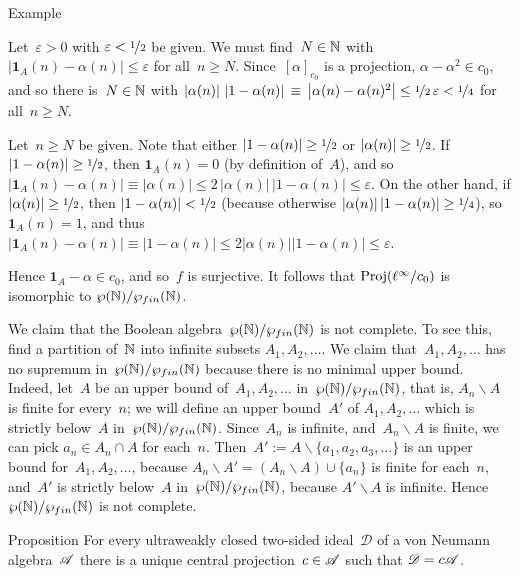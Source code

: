 \documentclass[a]{subfiles}
\begin{document}
\begin{parsec}
\begin{point}{Example}
\begin{point}
Let~$\varepsilon>0$ with $\varepsilon<\nicefrac{1}{2}$ be given.
We must find~$N\in\mathbb{N}$ with 
$\left| \mathbf{1}_A(n)-\alpha(n)\right|\leq \varepsilon$
for all~$n\geq N$.
Since~$[\alpha]_{c_0}$ is a projection,
$\alpha-\alpha^2\in c_0$,
and so
there is~$N\in \mathbb{N}$
with $\left|\alpha(n)\right| \,\left| 1-\alpha(n)\right|
\,\equiv\, \left| \alpha(n) - \alpha(n)^2 \right| \leq 
\nicefrac{1}{2}\,\varepsilon < \nicefrac{1}{4}$
for all~$n\geq N$.

Let~$n\geq N$ be given.
Note that either 
$\left|1-\alpha(n)\right|\geq \nicefrac{1}{2}$
or 
$\left|\alpha(n)\right|\geq \nicefrac{1}{2}$.
If~$\left|1-\alpha(n)\right|\geq\nicefrac{1}{2}$,
then $\mathbf{1}_A(n)=0$
(by definition of~$A$),
and so $\left|\mathbf{1}_A(n)-\alpha(n)\right|\equiv \left|\alpha(n)\right| 
\leq 2 \,\left|\alpha(n)\right|\,\left| 1-\alpha(n)\right|
\leq \varepsilon$.
On the other hand,
if  $\left|\alpha(n)\right| \geq \nicefrac{1}{2}$,
then $\left|1-\alpha(n)\right| < \nicefrac{1}{2}$
(because otherwise $\left|\alpha(n)\right|\left|1-\alpha(n)\right|
\geq \nicefrac{1}{4}$),
so $\mathbf{1}_A(n)=1$,
and thus
$\left|\mathbf{1}_A(n)-\alpha(n)\right|
\equiv \left|1-\alpha(n)\right|
\leq 2 \left|\alpha(n)\right|\left|1-\alpha(n)\right|
\leq \varepsilon$.

Hence $\mathbf{1}_A - \alpha \in c_0$,
and so~$f$ is surjective.
It follows that $\operatorname{Proj}(\ell^\infty/c_0)$
is isomorphic to $\wp(\mathbb{N})/\wp_{fin}(\mathbb{N})$.
\end{point}
\begin{point}%
We claim that the Boolean algebra~$\wp(\mathbb{N})/\wp_{fin}(\mathbb{N})$
is not complete.
To see this,
find a partition of~$\mathbb{N}$ into infinite subsets
$A_1,A_2,\dotsc$.
We claim that~$A_1,A_2,\dotsc$ has no supremum in~$\wp(\mathbb{N})/\wp_{fin}(\mathbb{N})$
because there is no minimal upper bound.
Indeed,
let~$A$ be an upper bound of~$A_1,A_2,\dotsc$ in~$\wp(\mathbb{N})/\wp_{fin}(\mathbb{N})$,
that is, $A_n\backslash A$ is finite for every~$n$;
we will define an upper bound~$A'$ of $A_1,A_2,\dotsc$
which is strictly below~$A$ in~$\wp(\mathbb{N})/\wp_{fin}(\mathbb{N})$.
Since~$A_n$ is infinite,
and~$A_n\backslash A$ is finite,
we can pick $a_n\in A_n\cap A$ for each~$n$.
Then~$A':=A \backslash \{a_1,a_2,a_3,\dotsc\}$
is an upper bound for~$A_1,A_2,\dotsc$,
because $A_n\backslash A' = (A_n\backslash A)\cup\{a_n\}$ is finite
for each~$n$,
and~$A'$ is strictly below~$A$ in~$\wp(\mathbb{N})/\wp_{fin}(\mathbb{N})$,
because $A'\backslash A$ is infinite.
Hence~$\wp(\mathbb{N})/\wp_{fin}(\mathbb{N})$
is not complete.
\end{point}
\begin{point}%
\end{point}
\end{point}
\begin{point}{Proposition}%
\label{prop:weakly-closed-ideal}
For every ultraweakly closed two-sided
ideal~$\mathscr{D}$ of a von Neumann algebra~$\mathscr{A}$
there is a unique central projection~$c\in\mathscr{A}$
such that $\mathscr{D} = c\mathscr{A}$.


\end{point}
\end{parsec}
\end{document}
